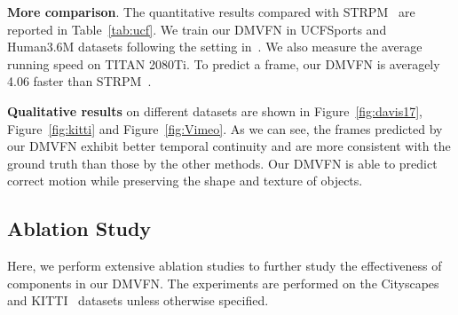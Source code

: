 \documentclass[10pt,twocolumn,letterpaper]{article}
\begin{document}
\begin{table}[!htb]
  \vspace{-2mm}
  \centering
  \caption{\textbf{Comparison between DMVFN and STRPM.}}
  \vspace{-1mm}
  \label{tab:ucf}
    \vspace{-0.2em}
\end{table}

\noindent
\textbf{More comparison}. The quantitative results compared with STRPM~\cite{strpm} are reported in Table~\ref{tab:ucf}. We train our DMVFN in UCFSports and Human3.6M datasets following the setting in~\cite{strpm}. We also measure the average running speed on TITAN 2080Ti. To predict a  frame, our DMVFN is averagely 4.06 faster than STRPM~\cite{strpm}.


\noindent
\textbf{Qualitative results} on different datasets are shown in Figure~\ref{fig:davis17}, Figure~\ref{fig:kitti} and Figure~\ref{fig:Vimeo}. As we can see, the frames predicted by our DMVFN exhibit better temporal continuity and are more consistent with the ground truth than those by the other methods. Our DMVFN is able to predict correct motion while preserving the shape and texture of objects.

\subsection{Ablation Study}
\label{sec:ablation}
Here, we perform extensive ablation studies to further study the effectiveness of components in our DMVFN. The experiments are performed on the Cityscapes~\cite{cityscapes} and KITTI~\cite{kitti} datasets unless otherwise specified.
\end{document}
